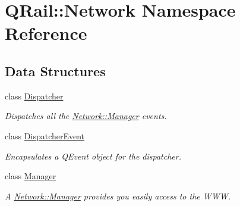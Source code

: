 \hypertarget{namespaceQRail_1_1Network}{}\section{Q\+Rail\+::Network Namespace Reference}
\label{namespaceQRail_1_1Network}
\subsection*{Data Structures}
\begin{DoxyCompactItemize}
\item 
class \mbox{\hyperlink{classQRail_1_1Network_1_1Dispatcher}{Dispatcher}}
\begin{DoxyCompactList}\small\item\em Dispatches all the \mbox{\hyperlink{classQRail_1_1Network_1_1Manager}{Network\+::\+Manager}} events. \end{DoxyCompactList}\item 
class \mbox{\hyperlink{classQRail_1_1Network_1_1DispatcherEvent}{Dispatcher\+Event}}
\begin{DoxyCompactList}\small\item\em Encapsulates a Q\+Event object for the dispatcher. \end{DoxyCompactList}\item 
class \mbox{\hyperlink{classQRail_1_1Network_1_1Manager}{Manager}}
\begin{DoxyCompactList}\small\item\em A \mbox{\hyperlink{classQRail_1_1Network_1_1Manager}{Network\+::\+Manager}} provides you easily access to the W\+WW. \end{DoxyCompactList}\end{DoxyCompactItemize}
